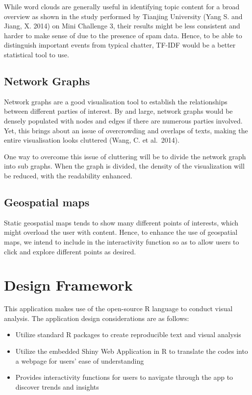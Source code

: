 \documentclass{acm_proc_article-sp}
\begin{document}
While word clouds are generally useful in identifying topic content for
a broad overview as shown in the study performed by Tianjing University
(Yang S. and Jiang, X. 2014) on Mini Challenge 3, their results might be
less consistent and harder to make sense of due to the presence of spam
data. Hence, to be able to distinguish important events from typical
chatter, TF-IDF would be a better statistical tool to use.

\hypertarget{network-graphs}{%
\subsection{Network Graphs}\label{network-graphs}}

Network graphs are a good visualisation tool to establish the
relationships between different parties of interest. By and large,
network graphs would be densely populated with nodes and edges if there
are numerous parties involved. Yet, this brings about an issue of
overcrowding and overlaps of texts, making the entire visualisation
looks cluttered (Wang, C. et al.~2014).

One way to overcome this issue of cluttering will be to divide the
network graph into sub graphs. When the graph is divided, the density of
the visualization will be reduced, with the readability enhanced.

\hypertarget{geospatial-maps}{%
\subsection{Geospatial maps}\label{geospatial-maps}}

Static geospatial maps tends to show many different points of interests,
which might overload the user with content. Hence, to enhance the use of
geospatial maps, we intend to include in the interactivity function so
as to allow users to click and explore different points as desired.

\hypertarget{design-framework}{%
\section{Design Framework}\label{design-framework}}

This application makes use of the open-source R language to conduct
visual analysis. The application design considerations are as follows:

\begin{itemize}
\item
  Utilize standard R packages to create reproducible text and visual
  analysis
\item
  Utilize the embedded Shiny Web Application in R to translate the codes
  into a webpage for users' ease of understanding
\item
  Provides interactivity functions for users to navigate through the app
  to discover trends and insights
\end{itemize}
\end{document}
